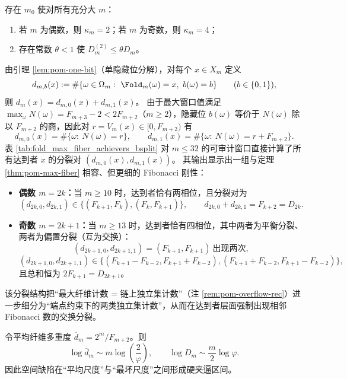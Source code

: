 \begin{conjecture}[最大纤维达到者的有限相位与间隙]\label{conj:pom-max-fiber-achievers-phase-gap}
存在 $m_0$ 使对所有充分大 $m$：
\begin{enumerate}
  \item 若 $m$ 为偶数，则 $\kappa_m=2$；若 $m$ 为奇数，则 $\kappa_m=4$；
  \item 存在常数 $\theta<1$ 使 $D_m^{(2)}\le \theta D_m$。
\end{enumerate}
\end{conjecture}

\begin{remark}\label{rem:pom-max-fiber-achievers-bsplit}
由引理 \ref{lem:pom-one-bit}（单隐藏位分解），对每个 \(x\in X_m\) 定义
\[
d_{m,b}(x):=\#\{\omega\in\Omega_m:\ \Fold_m(\omega)=x,\ b(\omega)=b\}\qquad(b\in\{0,1\}),
\]
则 \(d_m(x)=d_{m,0}(x)+d_{m,1}(x)\)。
由于最大窗口值满足 \(\max_{\omega}N(\omega)=F_{m+3}-2<2F_{m+2}\)（\(m\ge 2\)），隐藏位 \(b(\omega)\) 等价于 \(N(\omega)\) 除以 \(F_{m+2}\) 的商，因此对 \(r=V_m(x)\in[0,F_{m+2})\) 有
\[
d_{m,0}(x)=\#\{\omega:\ N(\omega)=r\},\qquad
d_{m,1}(x)=\#\{\omega:\ N(\omega)=r+F_{m+2}\}.
\]
表 \ref{tab:fold_max_fiber_achievers_bsplit} 对 \(m\le 32\) 的可审计窗口直接计算了所有达到者 \(x\) 的分裂对 \((d_{m,0}(x),d_{m,1}(x))\)。
其输出显示出一组与定理 \ref{thm:pom-max-fiber} 相容、但更细的 Fibonacci 刚性：
\begin{itemize}
  \item \textbf{偶数 \(m=2k\)：}当 \(m\ge 10\) 时，达到者恰有两相位，且分裂对为
  \[
  (d_{2k,0},d_{2k,1})\in\{(F_{k+1},F_k),(F_k,F_{k+1})\},\qquad d_{2k,0}+d_{2k,1}=F_{k+2}=D_{2k}.
  \]
  \item \textbf{奇数 \(m=2k+1\)：}当 \(m\ge 13\) 时，达到者恰有四相位，其中两者为平衡分裂、两者为偏置分裂（互为交换）：
  \[
  (d_{2k+1,0},d_{2k+1,1})=(F_{k+1},F_{k+1})\ \text{出现两次},
  \]
  \[
  (d_{2k+1,0},d_{2k+1,1})\in\{(F_{k+1}-F_{k-2},F_{k+1}+F_{k-2}),(F_{k+1}+F_{k-2},F_{k+1}-F_{k-2})\},
  \]
  且总和恒为 \(2F_{k+1}=D_{2k+1}\)。
\end{itemize}
该分裂结构把“最大纤维计数 = 链上独立集计数”（注 \ref{rem:pom-overflow-rec}）进一步细分为“端点约束下的两类独立集计数”，从而在达到者层面强制出现相邻 Fibonacci 数的交换分裂。
\end{remark}

\begin{corollary}[空间缺陷的夹逼区间]\label{cor:pom-defect-band}
令平均纤维多重度 $\overline d_m=2^m/F_{m+2}$。则
\[
\log \overline d_m\sim m\log\!\left(\frac{2}{\varphi}\right),
\qquad
\log D_m\sim \frac{m}{2}\log\varphi.
\]
因此空间缺陷在“平均尺度”与“最坏尺度”之间形成硬夹逼区间。
\end{corollary}

